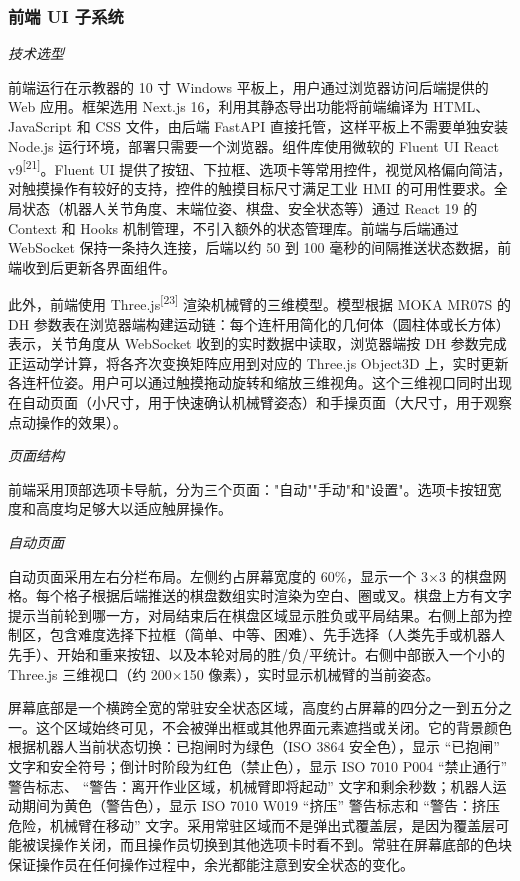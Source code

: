 \documentclass[a4paper, 12pt, oneside]{ctexart}
\newcommand{\supercite}[1]{\textsuperscript{[#1]}}
\begin{document}
\subsubsection*{前端 UI 子系统}

\noindent\textit{技术选型}

前端运行在示教器的 10 寸 Windows 平板上，用户通过浏览器访问后端提供的 Web 应用。框架选用 Next.js 16，利用其静态导出功能将前端编译为 HTML、JavaScript 和 CSS 文件，由后端 FastAPI 直接托管，这样平板上不需要单独安装 Node.js 运行环境，部署只需要一个浏览器。组件库使用微软的 Fluent UI React v9\supercite{21}。Fluent UI 提供了按钮、下拉框、选项卡等常用控件，视觉风格偏向简洁，对触摸操作有较好的支持，控件的触摸目标尺寸满足工业 HMI 的可用性要求。全局状态（机器人关节角度、末端位姿、棋盘、安全状态等）通过 React 19 的 Context 和 Hooks 机制管理，不引入额外的状态管理库。前端与后端通过 WebSocket 保持一条持久连接，后端以约 50 到 100 毫秒的间隔推送状态数据，前端收到后更新各界面组件。

此外，前端使用 Three.js\supercite{23} 渲染机械臂的三维模型。模型根据 MOKA MR07S 的 DH 参数表在浏览器端构建运动链：每个连杆用简化的几何体（圆柱体或长方体）表示，关节角度从 WebSocket 收到的实时数据中读取，浏览器端按 DH 参数完成正运动学计算，将各齐次变换矩阵应用到对应的 Three.js Object3D 上，实时更新各连杆位姿。用户可以通过触摸拖动旋转和缩放三维视角。这个三维视口同时出现在自动页面（小尺寸，用于快速确认机械臂姿态）和手操页面（大尺寸，用于观察点动操作的效果）。

\noindent\textit{页面结构}

前端采用顶部选项卡导航，分为三个页面："自动""手动"和"设置"。选项卡按钮宽度和高度均足够大以适应触屏操作。

\noindent\textit{自动页面}

自动页面采用左右分栏布局。左侧约占屏幕宽度的 60\%，显示一个 3$\times$3 的棋盘网格。每个格子根据后端推送的棋盘数组实时渲染为空白、圈或叉。棋盘上方有文字提示当前轮到哪一方，对局结束后在棋盘区域显示胜负或平局结果。右侧上部为控制区，包含难度选择下拉框（简单、中等、困难）、先手选择（人类先手或机器人先手）、开始和重来按钮、以及本轮对局的胜/负/平统计。右侧中部嵌入一个小的 Three.js 三维视口（约 200$\times$150 像素），实时显示机械臂的当前姿态。

屏幕底部是一个横跨全宽的常驻安全状态区域，高度约占屏幕的四分之一到五分之一。这个区域始终可见，不会被弹出框或其他界面元素遮挡或关闭。它的背景颜色根据机器人当前状态切换：已抱闸时为绿色（ISO 3864 安全色），显示 “已抱闸” 文字和安全符号；倒计时阶段为红色（禁止色），显示 ISO 7010 P004 “禁止通行” 警告标志、 “警告：离开作业区域，机械臂即将起动” 文字和剩余秒数；机器人运动期间为黄色（警告色），显示 ISO 7010 W019 “挤压” 警告标志和 “警告：挤压危险，机械臂在移动” 文字。采用常驻区域而不是弹出式覆盖层，是因为覆盖层可能被误操作关闭，而且操作员切换到其他选项卡时看不到。常驻在屏幕底部的色块保证操作员在任何操作过程中，余光都能注意到安全状态的变化。
\end{document}
